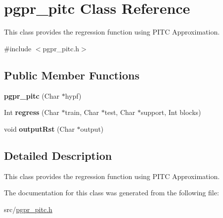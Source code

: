 \hypertarget{classpgpr__pitc}{\section{pgpr\-\_\-pitc Class Reference}
\label{classpgpr__pitc}
}


This class provides the regression function using P\-I\-T\-C Approximation.  




{\ttfamily \#include $<$pgpr\-\_\-pitc.\-h$>$}

\subsection*{Public Member Functions}
\begin{DoxyCompactItemize}
\item 
\hypertarget{classpgpr__pitc_a2601b1c97c337732619818b5812e9f08}{{\bfseries pgpr\-\_\-pitc} (Char $\ast$hypf)}\label{classpgpr__pitc_a2601b1c97c337732619818b5812e9f08}

\item 
\hypertarget{classpgpr__pitc_a9e6d568ecb48f4faa4d3bf0623d2be95}{Int {\bfseries regress} (Char $\ast$train, Char $\ast$test, Char $\ast$support, Int blocks)}\label{classpgpr__pitc_a9e6d568ecb48f4faa4d3bf0623d2be95}

\item 
\hypertarget{classpgpr__pitc_a47b39b307c1a0a22cf260dbbc683d0f2}{void {\bfseries output\-Rst} (Char $\ast$output)}\label{classpgpr__pitc_a47b39b307c1a0a22cf260dbbc683d0f2}

\end{DoxyCompactItemize}


\subsection{Detailed Description}
This class provides the regression function using P\-I\-T\-C Approximation. 

The documentation for this class was generated from the following file\-:\begin{DoxyCompactItemize}
\item 
src/\hyperlink{pgpr__pitc_8h}{pgpr\-\_\-pitc.\-h}\end{DoxyCompactItemize}
